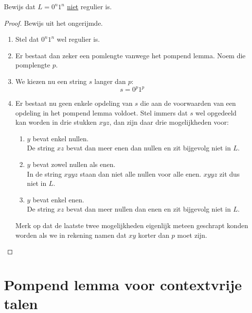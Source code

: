 \documentclass[main.tex]{subfiles}
\begin{document}
\begin{vb}
  Bewijs dat $L = 0^{n}1^{n}$ \underline{niet} regulier is.
  \begin{proof}
    Bewijs uit het ongerijmde.
    \begin{enumerate}
    \item Stel dat $0^{n}1^{n}$ wel regulier is.
    \item Er bestaat dan zeker een pomlengte vanwege het pompend lemma.
      Noem die pomplengte $p$.
    \item We kiezen nu een string $s$ langer dan $p$:
      \[ s = 0^{p}1^{p} \]
    \item Er bestaat nu geen enkele opdeling van $s$ die aan de voorwaarden van een opdeling in het pompend lemma voldoet.
      Stel immers dat $s$ wel opgedeeld kan worden in drie stukken $xyz$, dan zijn daar drie mogelijkheden voor:
      \begin{enumerate}
      \item $y$ bevat enkel nullen.\\
        De string $xz$ bevat dan meer enen dan nullen en zit bijgevolg niet in $L$.
      \item $y$ bevat zowel nullen als enen.\\
        In de string $xyyz$ staan dan niet alle nullen voor alle enen. $xyyz$ zit dus niet in $L$. 
      \item $y$ bevat enkel enen.\\
        De string $xz$ bevat dan meer nullen dan enen en zit bijgevolg niet in $L$.
      \end{enumerate}
      Merk op dat de laatste twee mogelijkheden eigenlijk meteen geschrapt konden worden als we in rekening namen dat $xy$ korter dan $p$ moet zijn.
    \end{enumerate}
  \end{proof}
\end{vb}

\section{Pompend lemma voor contextvrije talen}
\label{sec:pompend-lemma-voor-contextvrije-talen}
\end{document}
